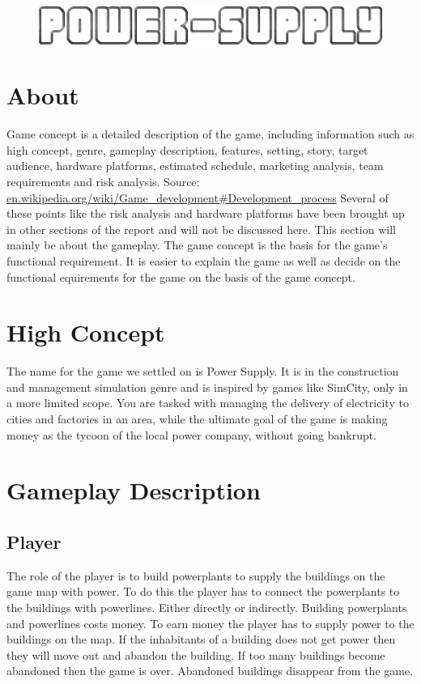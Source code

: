     \begin{figure}[H]
    	\includegraphics[scale=0.40]{pictures/logo2.png}
    \end{figure}

\section{About}
    Game concept is a detailed description of the game, including information such as high concept, genre,
    gameplay description, features, setting, story, target audience, hardware platforms, estimated schedule,
    marketing analysis, team requirements and risk analysis. Source: 
    \url{en.wikipedia.org/wiki/Game_development#Development_process}
    Several of these points like the risk analysis and hardware platforms have been brought up in other 
    sections of the report and will not be discussed here. This section will mainly be about the gameplay. 
    The game concept is the basis for the game's functional requirement. It is easier to explain the game 
    as well as decide on the functional equirements for the game on the basis of the game concept. 


\section{High Concept}
    The name for the game we settled on is Power Supply. It is in the construction and management 
    simulation genre and is inspired by games like SimCity, only in a more limited scope. You are 
    tasked with managing the delivery of electricity to cities and factories in an area, while the 
    ultimate goal of the game is making money as the tycoon of the local power company, without going 
    bankrupt.

\section{Gameplay Description}

\subsection*{Player}
    The role of the player is to build powerplants to supply the buildings on the game map with power. 
    To do this the player has to connect the powerplants to the buildings with powerlines. Either directly
    or indirectly. Building powerplants and powerlines costs money. To earn money the player has to supply
    power to the buildings on the map. If the inhabitants of a building does not get power then they will
    move out and abandon the building. If too many buildings become abandoned then the game is over.
    Abandoned buildings disappear from the game.

